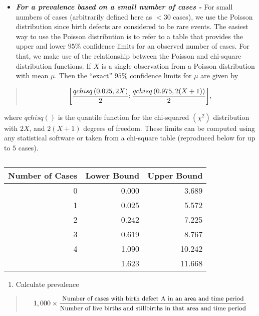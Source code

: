 \documentclass[
]{krantz}
\providecommand{\tightlist}{%
  \setlength{\itemsep}{0pt}\setlength{\parskip}{0pt}}
\begin{document}
\begin{itemize}
\tightlist
\item
  \textbf{\emph{For a prevalence based on a small number of cases -}} For small numbers of cases (arbitrarily defined here as \(< 30\) cases), we use the Poisson distribution since birth defects are considered to be rare events. The easiest way to use the Poisson distribution is to refer to a table that provides the upper and lower \(95\%\) confidence limits for an observed number of cases. For that, we make use of the relationship between the Poisson and chi-square distribution functions. If \(X\) is a single observation from a Poisson distribution with mean \(\mu\). Then the ``exact'' \(95\%\) confidence limits for \(\mu\) are given by
\end{itemize}

\begin{quote}
\[\small{\left[\dfrac{qchisq\left(0.025, 2X\right)}{2}; \dfrac{qchisq\left(0.975, 2(X+1)\right)}{2}\right]},\]
\end{quote}

where \(qchisq()\) is the quantile function for the chi-squared \(\left(\chi^{2}\right)\) distribution with \(2X\), and \(2(X+1)\) degrees of freedom. These limits can be computed using any statistical software or taken from a chi-square table (reproduced below for up to \(5\) cases).

\begin{table}

\caption{\label{tab:pois-1}}
\centering
\begin{tabular}[t]{rrr}
\toprule
Number of Cases & Lower Bound & Upper Bound\\
\midrule
0 & 0.000 & 3.689\\
1 & 0.025 & 5.572\\
2 & 0.242 & 7.225\\
3 & 0.619 & 8.767\\
4 & 1.090 & 10.242\\
\addlinespace
5 & 1.623 & 11.668\\
\bottomrule
\end{tabular}
\end{table}

\begin{enumerate}
\def\labelenumi{\arabic{enumi}.}
\tightlist
\item
  Calculate prevalence
\end{enumerate}

\begin{quote}
\[\small{
1,000 \times \dfrac{\text{Number of cases with birth defect A in an area and time period}}{\text{Number of live births and stillbirths in that area and time period}}
}\]
\end{quote}
\end{document}
